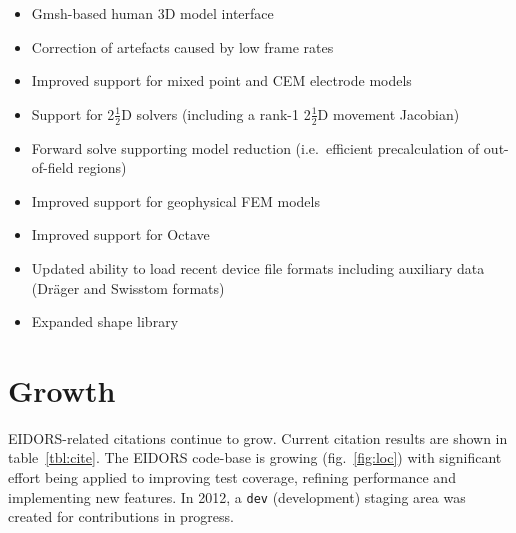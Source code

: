 \documentclass[10pt,letterpaper]{article}
\begin{document}
\begin{multicols}{2}
\begin{itemize}
\item Gmsh-based human 3D model interface \cite{grychtol2016}

\item Correction of artefacts caused by low frame rates \cite{yerworth2016}

\item Improved support for mixed point and CEM electrode models


\item Support for 2$\frac{1}{2}$D solvers (including a rank-1 2$\frac{1}{2}$D movement Jacobian)
   \cite{boyle2016model2p5}

\item Forward solve supporting model reduction (i.e.\ efficient
       precalculation of out-of-field regions) \cite{adler2016model}



\item Improved support for geophysical FEM models


\item Improved support for Octave

\item Updated ability to load recent device file formats including
       auxiliary data (Dr\"ager and Swisstom formats)




\item Expanded shape library
\end{itemize}

\section{Growth}
EIDORS-related citations continue to grow. Current citation results are
shown in table~\ref{tbl:cite}.
%
The EIDORS code-base is growing
(fig.~\ref{fig:loc})
 with significant effort being applied to
improving test coverage, refining performance and implementing new features.
 In 2012, a {\tt dev} (development) staging area was created for
contributions in progress.


\end{multicols}
\end{document}
